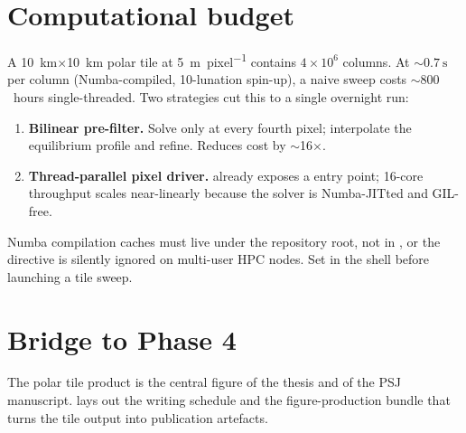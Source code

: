 \section{Computational budget}

A \SI{10}{\kilo\meter}$\times$\SI{10}{\kilo\meter} polar tile at
\SI{5}{\meter\per pixel} contains $4{\times}10^{6}$ columns.  At
${\sim}\SI{0.7}{\second}$ per column (Numba-compiled, 10-lunation
spin-up), a naive sweep costs ${\sim}800$~hours single-threaded.
Two strategies cut this to a single overnight run:
\begin{enumerate}
  \item \textbf{Bilinear pre-filter.}  Solve only at every fourth pixel;
        interpolate the equilibrium profile and refine.  Reduces cost
        by $\sim$\num{16}$\times$.
  \item \textbf{Thread-parallel pixel driver.}
         already exposes a
         entry point; 16-core throughput
        scales near-linearly because the solver is Numba-JITted and
        GIL-free.
\end{enumerate}

\begin{warning}
Numba compilation caches must live under the repository root, not in
, or the  directive is silently
ignored on multi-user HPC nodes.  Set
 in the shell before
launching a tile sweep.
\end{warning}

\section{Bridge to Phase 4}

The polar tile product is the central figure of the thesis and of the
PSJ manuscript.   lays out the writing schedule and
the figure-production bundle that turns the tile output into
publication artefacts.

